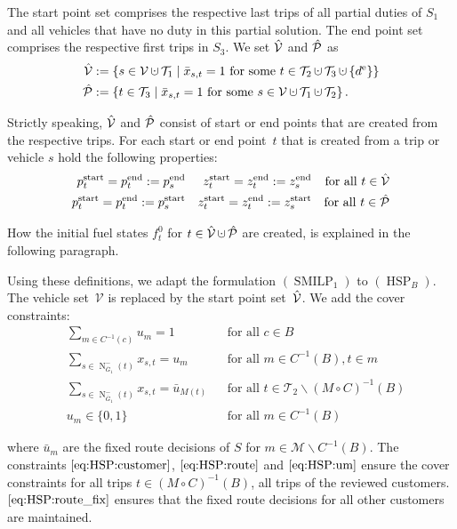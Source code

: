 The start point set comprises the respective last trips of all partial duties of $S_1$ and all vehicles that have no duty in this partial solution. The end point set comprises the respective first trips in $S_3$. We set $\hat{\mathcal{V}}$ and $\hat{\mathcal{P}}$ as
\begin{align*}
	\Vhat & := \left\{s\in\mathcal{V}\cupdot\mathcal{T}_1\mid\bar{x}_{s,t}=1\text{ for some } t\in\mathcal{T}_2\cupdot\mathcal{T}_3\cupdot\left\{\de\right\}\right\} \\
	\Phat & := \left\{t\in\mathcal{T}_3\mid\bar{x}_{s,t}=1\text{ for some } s\in\mathcal{V}\cupdot\mathcal{T}_1\cupdot\mathcal{T}_2\right\}.
\end{align*}

Strictly speaking, $\hat{\mathcal{V}}$ and $\hat{\mathcal{P}}$ consist of start or end points that are created from the respective trips. For each start or end point~$t$ that is created from a trip or vehicle $s$ hold the following properties:
\begin{align*}
	p^{\operatorname{start}}_t = p^{\operatorname{end}}_t := p^{\operatorname{end}}_s && z^{\operatorname{start}}_t = z^{\operatorname{end}}_t := z^{\operatorname{end}}_s && \text{for all } t\in\hat{\mathcal{V}} \\
	p^{\operatorname{start}}_t = p^{\operatorname{end}}_t := p^{\operatorname{start}}_s && z^{\operatorname{start}}_t = z^{\operatorname{end}}_t := z^{\operatorname{start}}_s && \text{for all } t\in\hat{\mathcal{P}}
\end{align*}

How the initial fuel states $f^0_t$ for ${t\in\Vhat\cupdot\Phat}$ are created, is explained in the following paragraph.

Using these definitions, we adapt the formulation $(\operatorname{SMILP}_1)$ to $(\operatorname{HSP}_B)$. The vehicle set~$\mathcal{V}$ is replaced by the start point set~$\hat{\mathcal{V}}$. We add the cover constraints:
\begin{align}
	& \sum_{m\in C^{-1}(c)} u_m = 1 && \text{for all } c\in B \label{eq:HSP:customer} \\
	& \sum_{s\in\operatorname{N}_{\overline{G}_1}^-(t)} x_{s,t} = u_m && \text{for all } m\in C^{-1}(B),t\in m \label{eq:HSP:route} \\
	& \sum_{s\in\operatorname{N}_{\overline{G}_1}^-(t)} x_{s,t} = \bar{u}_{M(t)} && \text{for all } t\in\mathcal{T}_2\backslash(M\circ C)^{-1}(B) \label{eq:HSP:route_fix} \\
	& u_m\in\{0,1\} && \text{for all } m\in C^{-1}(B) \label{eq:HSP:um}
\end{align}

where $\bar{u}_m$ are the fixed route decisions of $S$ for ${m\in\mathcal{M}\backslash C^{-1}(B)}$. The constraints $\eqref{eq:HSP:customer}$, $\eqref{eq:HSP:route}$ and $\eqref{eq:HSP:um}$ ensure the cover constraints for all trips ${t\in(M\circ C)^{-1}(B)}$, \ie all trips of the reviewed customers. $\eqref{eq:HSP:route_fix}$ ensures that the fixed route decisions for all other customers are maintained. 

